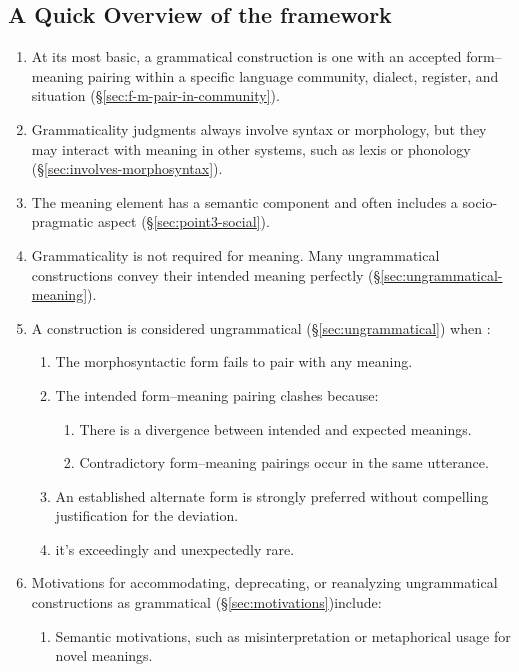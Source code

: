\subsection*{A Quick Overview of the framework}
\begin{enumerate}
    \item At its most basic, a grammatical construction is one with an accepted form--meaning pairing within a specific language community, dialect, register, and situation (\S\ref{sec:f-m-pair-in-community}).
    \item Grammaticality judgments always involve syntax or morphology, but they may interact with meaning in other systems, such as lexis or phonology (\S\ref{sec:involves-morphosyntax}). 
    \item The meaning element has a semantic component and often includes a socio-pragmatic aspect (\S\ref{sec:point3-social}).
    \item Grammaticality is not required for meaning. Many ungrammatical constructions convey their intended meaning perfectly (\S\ref{sec:ungrammatical-meaning}).
    \item A construction is considered ungrammatical (\S\ref{sec:ungrammatical}) when :
        \begin{enumerate}
            \item The morphosyntactic form fails to pair with any meaning.
            \item The intended form--meaning pairing clashes because:
                \begin{enumerate}
                    \item There is a divergence between intended and expected meanings.
                    \item Contradictory form--meaning pairings occur in the same utterance.
                \end{enumerate}
            \item An established alternate form is strongly preferred without compelling justification for the deviation.
            \item it's exceedingly and unexpectedly rare.
        \end{enumerate}
    \item Motivations for accommodating, deprecating, or reanalyzing ungrammatical constructions as grammatical (\S\ref{sec:motivations})include:
        \begin{enumerate}
            \item Semantic motivations, such as misinterpretation or metaphorical usage for novel meanings.

\end{enumerate}
\end{enumerate}

